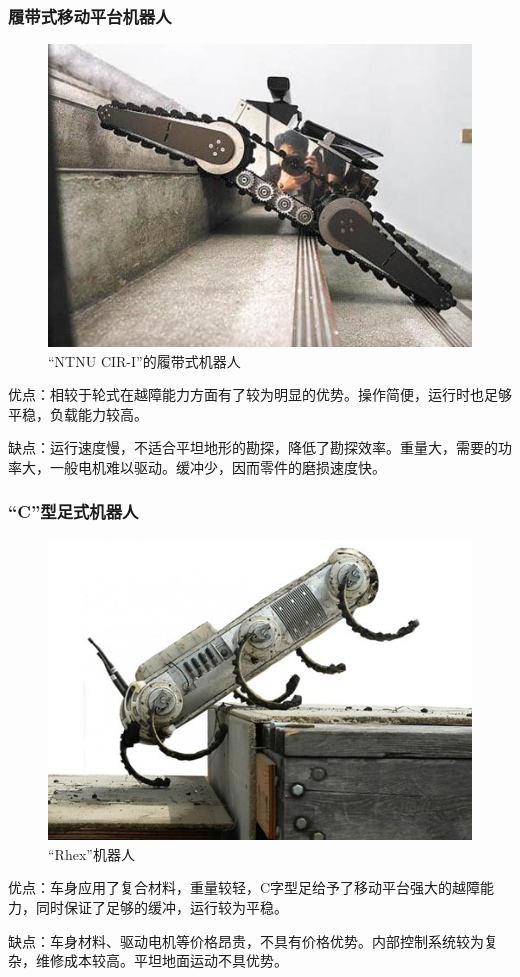 \documentclass[12pt]{article}
\begin{document}
\begin{CJK}{UTF8}{song}
\subsubsection{履带式移动平台机器人}
\begin{figure}[H]
\centering
\includegraphics[width=.8\textwidth]{chap1//fig3.jpg}
\caption{“NTNU CIR-I”的履带式机器人}
\end{figure}
优点：相较于轮式在越障能力方面有了较为明显的优势。操作简便，运行时也足够平稳，负载能力较高。\par
缺点：运行速度慢，不适合平坦地形的勘探，降低了勘探效率。重量大，需要的功率大，一般电机难以驱动。缓冲少，因而零件的磨损速度快。

\subsubsection{“C”型足式机器人}
\begin{figure}[H]
\centering
\includegraphics[width=.8\textwidth]{chap1//fig4.jpg}
\caption{“Rhex”机器人}
\end{figure}
优点：车身应用了复合材料，重量较轻，C字型足给予了移动平台强大的越障能力，同时保证了足够的缓冲，运行较为平稳。\par
缺点：车身材料、驱动电机等价格昂贵，不具有价格优势。内部控制系统较为复杂，维修成本较高。平坦地面运动不具优势。


\end{CJK}
\end{document}
